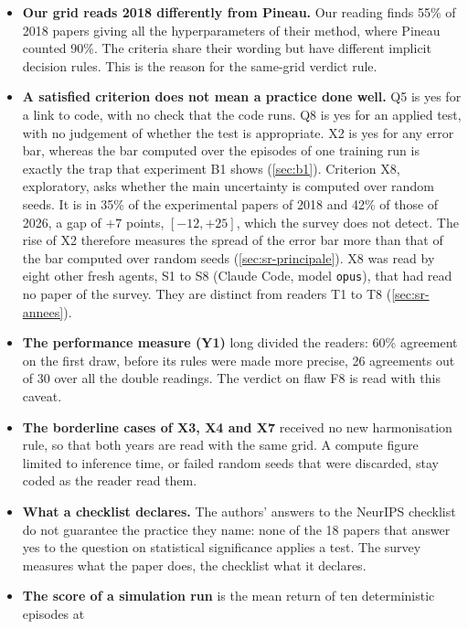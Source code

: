\begin{itemize}
  \item \textbf{Our grid reads 2018 differently from Pineau.} Our reading finds 55\% of 2018 papers
        giving all the hyperparameters of their method, where Pineau counted 90\%. The criteria
        share their wording but have different implicit decision rules. This is the reason for the
        same-grid verdict rule.
  \item \textbf{A satisfied criterion does not mean a practice done well.} Q5 is yes for a link to
        code, with no check that the code runs. Q8 is yes for an applied test, with no judgement of
        whether the test is appropriate. X2 is yes for any error bar, whereas the bar computed over
        the episodes of one training run is exactly the trap that experiment B1 shows
        (\cref{sec:b1}). Criterion X8, exploratory, asks whether the main
        uncertainty is computed over random seeds. It is in 35\% of the experimental papers of 2018
        and 42\% of those of 2026, a gap of $+7$ points, $[-12, +25]$, which the survey does not
        detect. The rise of X2 therefore measures the spread of the error bar more than that of the
        bar computed over random seeds (\cref{sec:sr-principale}). X8 was read by eight other
        fresh agents, S1 to S8 (Claude Code, model \texttt{opus}), that had read no paper
        of the survey. They are distinct from readers T1 to T8 (\cref{sec:sr-annees}).
  \item \textbf{The performance measure (Y1)} long divided the readers: 60\% agreement on the first
        draw, before its rules were made more precise, 26 agreements out of 30 over all the double
        readings. The verdict on flaw F8 is read with this caveat.
  \item \textbf{The borderline cases of X3, X4 and X7} received no new harmonisation rule, so that
        both years are read with the same grid. A compute figure limited to inference time, or failed
        random seeds that were discarded, stay coded as the reader read them.
  \item \textbf{What a checklist declares.} The authors' answers to the NeurIPS checklist do not
        guarantee the practice they name: none of the 18 papers that answer yes to the question on
        statistical significance applies a test. The survey measures what the paper does, the
        checklist what it declares.
  \item \textbf{The score of a simulation run} is the mean return of ten deterministic episodes at

\end{itemize}
